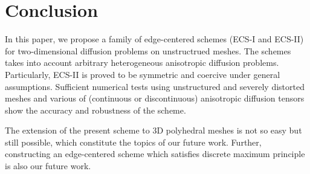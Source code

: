 \documentclass[times,review,preprint]{elsarticle}
\begin{document}
\section{Conclusion}\label{sec6}

In this paper, we propose a family of edge-centered schemes (ECS-I and ECS-II) for two-dimensional diffusion problems on unstructrued meshes. The schemes takes into account arbitrary heterogeneous anisotropic diffusion problems.
Particularly, ECS-II is proved to be symmetric and coercive under general assumptions.
Sufficient numerical tests using unstructured and severely distorted meshes and various of (continuous or discontinuous) anisotropic diffusion tensors show the accuracy and robustness of the scheme.

The extension of the present scheme to 3D polyhedral meshes is not so easy but still possible, which constitute the topics of our future work.
Further, constructing an edge-centered scheme which satisfies discrete maximum principle is also our future work.





\end{document}
